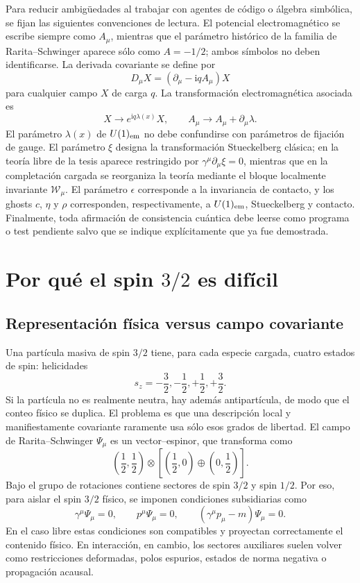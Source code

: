 \documentclass[11pt,a4paper]{article}
\numberwithin{equation}{section}
\newcommand{\Wcal}{\mathcal W}
\newcommand{\sdel}{\gamma^\mu\partial_\mu}
\newcommand{\slp}{\gamma^\mu p_\mu}
\newcommand{\ii}{\mathrm i}
\begin{document}
Para reducir ambigüedades al trabajar con agentes de código o álgebra simbólica, se fijan las siguientes convenciones de lectura.
El potencial electromagnético se escribe siempre como $A_\mu$, mientras que el parámetro histórico de la familia de Rarita--Schwinger aparece sólo como $A=-1/2$; ambos símbolos no deben identificarse.
La derivada covariante se define por
\begin{equation}
D_\mu X=(\partial_\mu-\ii q A_\mu)X
\end{equation}
para cualquier campo $X$ de carga $q$.
La transformación electromagnética asociada es
\begin{equation}
X\to e^{\ii q\lambda(x)}X,
\qquad
A_\mu\to A_\mu+\partial_\mu\lambda.
\end{equation}
El parámetro $\lambda(x)$ de $U(1)_{\rm em}$ no debe confundirse con parámetros de fijación de gauge.
El parámetro $\xi$ designa la transformación Stueckelberg clásica; en la teoría libre de la tesis aparece restringido por $\sdel\xi=0$, mientras que en la completación cargada se reorganiza la teoría mediante el bloque localmente invariante $\Wcal_\mu$.
El parámetro $\epsilon$ corresponde a la invariancia de contacto, y los ghosts $c$, $\eta$ y $\rho$ corresponden, respectivamente, a $U(1)_{\rm em}$, Stueckelberg y contacto.
Finalmente, toda afirmación de consistencia cuántica debe leerse como programa o test pendiente salvo que se indique explícitamente que ya fue demostrada.

\section{Por qué el spin \texorpdfstring{$3/2$}{3/2} es difícil}
\label{sec:por-que-el-spin-3-2-es-dificil}

\subsection{Representación física versus campo covariante}
\label{subsec:representacion-fisica-versus-campo-covariante}

Una partícula masiva de spin $3/2$ tiene, para cada especie cargada, cuatro estados de spin: helicidades
\[
s_z=-\frac32,-\frac12,+\frac12,+\frac32 .
\]
Si la partícula no es realmente neutra, hay además antipartícula, de modo que el conteo físico se duplica. El problema es que una descripción local y manifiestamente covariante raramente usa sólo esos grados de libertad. El campo de Rarita--Schwinger $\Psi_\mu$ es un vector--espinor, que transforma como
\[
\left(\frac12,\frac12\right)\otimes
\left[\left(\frac12,0\right)\oplus\left(0,\frac12\right)\right].
\]
Bajo el grupo de rotaciones contiene sectores de spin $3/2$ y spin $1/2$. Por eso, para aislar el spin $3/2$ físico, se imponen condiciones subsidiarias como
\begin{equation}
\gamma^\mu\Psi_\mu=0,
\qquad
p^\mu\Psi_\mu=0,
\qquad
(\slp-m)\Psi_\mu=0.
\end{equation}
En el caso libre estas condiciones son compatibles y proyectan correctamente el contenido físico. En interacción, en cambio, los sectores auxiliares suelen volver como restricciones deformadas, polos espurios, estados de norma negativa o propagación acausal.
\end{document}
